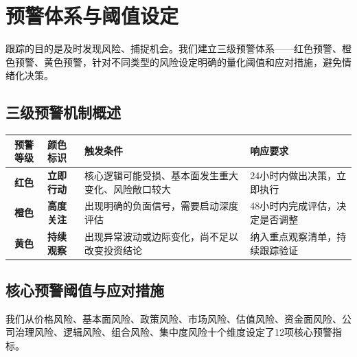 \section{预警体系与阈值设定}

跟踪的目的是及时发现风险、捕捉机会。我们建立三级预警体系——红色预警、橙色预警、黄色预警，针对不同类型的风险设定明确的量化阈值和应对措施，避免情绪化决策。

\subsection{三级预警机制概述}

\begin{exhibitbox}[表9-11：三级预警等级定义与响应机制]
\scriptsize
\setlength{\tabcolsep}{3pt}
\renewcommand{\arraystretch}{1.15}
\begin{tabularx}{\textwidth}{c l X l}
\toprule
\textbf{预警等级} & \textbf{颜色标识} & \textbf{触发条件} & \textbf{响应要求} \\
\midrule
\rowcolor{riskred!15}
\textbf{红色} & \textbf{立即行动} & 核心逻辑可能受损、基本面发生重大变化、风险敞口较大 & 24小时内做出决策，立即执行 \\
\rowcolor{riskamber!15}
\textbf{橙色} & \textbf{高度关注} & 出现明确的负面信号，需要启动深度评估 & 48小时内完成评估，决定是否调整 \\
\rowcolor{riskgreen!15}
\textbf{黄色} & \textbf{持续观察} & 出现异常波动或边际变化，尚不足以改变投资结论 & 纳入重点观察清单，持续跟踪验证 \\
\bottomrule
\end{tabularx}
\end{exhibitbox}

\subsection{核心预警阈值与应对措施}

我们从价格风险、基本面风险、政策风险、市场风险、估值风险、资金面风险、公司治理风险、逻辑风险、组合风险、集中度风险十个维度设定了12项核心预警指标。


